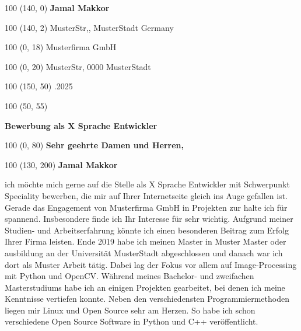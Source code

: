 \documentclass{article}%
\begin{document}
%
\normalsize%
\begin{minipage}{\textwidth}%
\begin{textblock}{100}%
(140, 0)%
\noindent%
\textbf{Jamal Makkor}%
\end{textblock}%
\begin{textblock}{100}%
(140, 2)%
\noindent%
\newline%
MusterStr,, MusterStadt\newline%
Germany\newline%
%
\end{textblock}%
\begin{textblock}{100}%
(0, 18)%
\noindent%
Musterfirma GmbH%
\end{textblock}%
\begin{textblock}{100}%
(0, 20)%
\noindent%
\newline%
MusterStr, 0000\newline%
MusterStadt\newline%
%
\end{textblock}%
\begin{textblock}{100}%
(150, 50)%
.2025%
\end{textblock}%
\begin{textblock}{100}%
(50, 55)%
\noindent%
\begin{large}%
\textbf{Bewerbung als                         X Sprache Entwickler}%
\end{large}%
\end{textblock}%
\begin{textblock}{100}%
(0, 80)%
\noindent%
\textbf{Sehr geehrte Damen und Herren,}%
\end{textblock}%
\begin{textblock}{100}%
(130, 200)%
\noindent%
\textbf{Jamal Makkor}%
\end{textblock}%
\vspace*{90mm}%
\onehalfspacing%
ich möchte mich gerne auf die Stelle als X Sprache Entwickler mit Schwerpunkt Speciality bewerben, die mir auf Ihrer Internetseite gleich ins Auge gefallen ist. Gerade das Engagement von Musterfirma GmbH in Projekten zur  halte ich für spannend. Insbesondere finde ich Ihr Interesse für  sehr wichtig. Aufgrund meiner Studien{-} und Arbeitserfahrung könnte ich einen besonderen Beitrag zum Erfolg Ihrer Firma leisten.\newline%
\newline%
Ende 2019 habe ich meinen Master in Muster Master oder ausbildung an der Universität MusterStadt abgeschlossen und danach war ich dort als Muster Arbeit tätig. Dabei lag der Fokus vor allem auf Image{-}Processing mit Python und OpenCV. Während meines Bachelor{-} und zweifachen Masterstudiums habe ich an einigen Projekten gearbeitet, bei denen ich meine Kenntnisse vertiefen konnte. Neben den verschiedensten Programmiermethoden liegen mir Linux und Open Source sehr am Herzen. So habe ich schon verschiedene Open Source Software in Python und C++ veröffentlicht.\newline%

\end{minipage}
\end{document}
